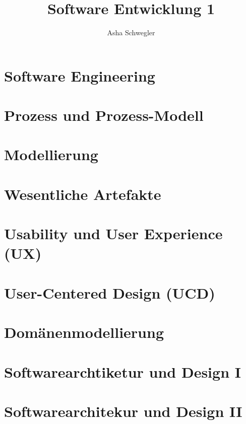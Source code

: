 \documentclass{article}
\title{Software Entwicklung 1}
\author{Asha Schwegler}
\begin{document}
\maketitle
\tableofcontents
\newpage


\section{Software Engineering}





\section{Prozess und Prozess-Modell}


\section{Modellierung}


\section{Wesentliche Artefakte}



\section{Usability und User Experience (UX)}


\section{User-Centered Design (UCD)}




\section{Domänenmodellierung}




\section{Softwarearchtiketur und Design I}


\section{Softwarearchitekur und Design II}

\end{document}
